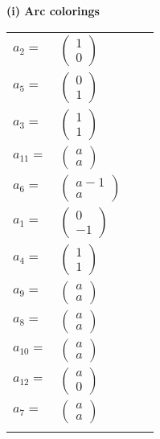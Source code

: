 \documentclass[1p]{elsarticle_modified}
\theoremstyle{definition}
\begin{document}
\flushleft \textbf{(i) Arc colorings}\\
\begin{tabular}{m{7pt} m{180pt} m{7pt} m{180pt} }
\flushright $a_{2}=$&$\begin{pmatrix}1\\0\end{pmatrix}$ \\
\flushright $a_{5}=$&$\begin{pmatrix}0\\1\end{pmatrix}$ \\
\flushright $a_{3}=$&$\begin{pmatrix}1\\1\end{pmatrix}$ \\
\flushright $a_{11}=$&$\begin{pmatrix}a\\a\end{pmatrix}$ \\
\flushright $a_{6}=$&$\begin{pmatrix}a-1\\a\end{pmatrix}$ \\
\flushright $a_{1}=$&$\begin{pmatrix}0\\-1\end{pmatrix}$ \\
\flushright $a_{4}=$&$\begin{pmatrix}1\\1\end{pmatrix}$ \\
\flushright $a_{9}=$&$\begin{pmatrix}a\\a\end{pmatrix}$ \\
\flushright $a_{8}=$&$\begin{pmatrix}a\\a\end{pmatrix}$ \\
\flushright $a_{10}=$&$\begin{pmatrix}a\\a\end{pmatrix}$ \\
\flushright $a_{12}=$&$\begin{pmatrix}a\\0\end{pmatrix}$ \\
\flushright $a_{7}=$&$\begin{pmatrix}a\\a\end{pmatrix}$\\&\end{tabular}
\end{document}
